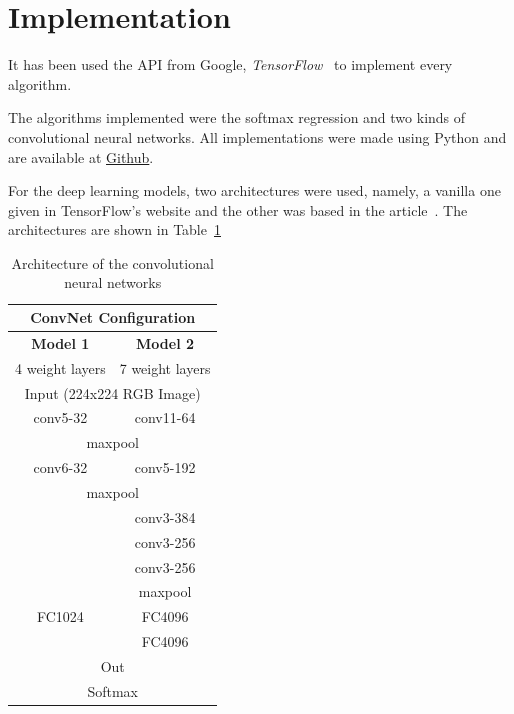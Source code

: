 \documentclass{article}
\begin{document}
\section{Implementation}
  It has been used the API from Google, \emph{TensorFlow}~\cite{tensorflow2015}
  to implement every algorithm.

  The algorithms implemented were the softmax regression and two kinds of
  convolutional neural networks. All implementations were made using Python and
  are available at \href{https://github.com/chronchi/CM116/tree/master/Projeto}{Github}.

  For the deep learning models, two architectures were used, namely, a vanilla
  one given in TensorFlow's website and the other was based in the
  article~\cite{ImageNet}. The architectures are shown in Table~\ref{tab:archdeep}
  \begin{table}[hbt]
    \centering
    \caption{Architecture of the convolutional neural networks}
    \vskip 1.5mm
    \label{tab:archdeep}
    \begin{tabular}{|c|c|}
      \hline
      \multicolumn{2}{|c|}{ConvNet Configuration}     \\ \hline
      \textbf{Model 1}        & \textbf{Model 2}      \\ \hline
      4 weight layers         & 7 weight layers       \\ \hline
      \multicolumn{2}{|c|}{Input (224x224 RGB Image)} \\ \hline
      conv5-32                & conv11-64             \\ \hline
      \multicolumn{2}{|c|}{maxpool}                   \\ \hline
      conv6-32                & conv5-192             \\ \hline
      \multicolumn{2}{|c|}{maxpool}                   \\ \hline
      \multirow{3}{*}{}       & conv3-384             \\
                              & conv3-256             \\
                              & conv3-256             \\ \cline{2-2}
                              & maxpool               \\ \cline{2-2}
      FC1024                  & FC4096                \\
                              & FC4096                \\ \hline
      \multicolumn{2}{|c|}{Out}                       \\ \hline
      \multicolumn{2}{|c|}{Softmax}                   \\ \hline
    \end{tabular}
  \end{table}
\end{document}
